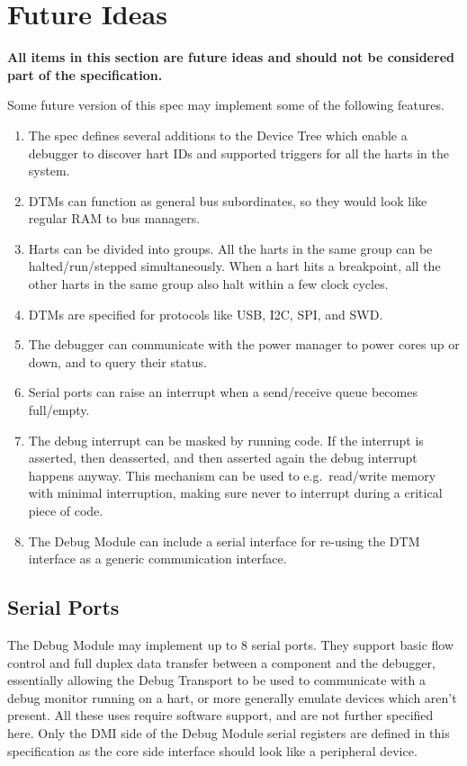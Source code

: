 \chapter{Future Ideas}
\label{sec:future}

\textbf{All items in this section are future ideas and should not be considered part of the specification.}

Some future version of this spec may implement some of the following features.

\begin{enumerate}
   \item The spec defines several additions to the Device Tree which enable a
      debugger to discover hart IDs and supported triggers for all the harts
      in the system.
   \item DTMs can function as general bus subordinates, so they would look like
      regular RAM to bus managers.
   \item Harts can be divided into groups. All the harts in the same group can
      be halted/run/stepped simultaneously. When a hart hits a breakpoint, all
      the other harts in the same group also halt within a few clock cycles.
   \item DTMs are specified for protocols like USB, I2C, SPI, and SWD.
   \item The debugger can communicate with the power manager to power cores up
      or down, and to query their status.
   \item Serial ports can raise an interrupt when a send/receive queue becomes full/empty.
   \item The debug interrupt can be masked by running code. If the interrupt is
      asserted, then deasserted, and then asserted again the debug interrupt
      happens anyway. This mechanism can be used to e.g.\ read/write memory with
      minimal interruption, making sure never to interrupt during a critical
      piece of code.
   \item The Debug Module can include a serial interface for re-using
      the DTM interface as a generic communication interface.
\end{enumerate}

\section{Serial Ports}

The Debug Module may implement up to 8 serial ports. They support basic flow
control and full duplex data transfer between a component and the debugger,
essentially allowing the Debug Transport to be used to communicate
with a debug monitor running on a hart, or more generally emulate devices which
aren't present. All these uses require software support, and are not further specified here.
Only the DMI side of the Debug Module serial registers are defined in this
specification as the core side interface should look like a peripheral device.



